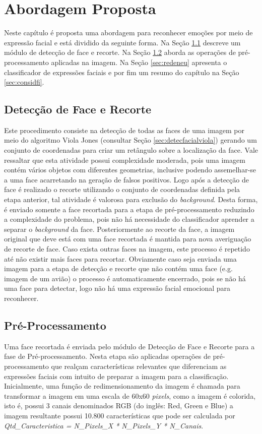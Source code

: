 \chapter{Abordagem Proposta}\label{sec:abordagemproposta}
Neste capítulo é proposta uma abordagem para reconhecer emoções por meio de expressão facial e está dividido da seguinte forma. Na Seção \ref{sec:detect} descreve um módulo de detecção de face e recorte. Na Seção \ref{sec:preproc} aborda as operações de pré-processamento aplicadas na imagem. Na Seção \ref{sec:redeneu} apresenta o classificador de expressões faciais e por fim um resumo do capítulo na Seção \ref{sec:considfi}.

\section{Detecção de Face e Recorte}\label{sec:detect}
Este procedimento consiste na detecção de todas as faces de uma imagem por meio do algoritmo Viola Jones (consultar Seção \ref{sec:detecfacialviola}) gerando um conjunto de coordenadas para criar um retângulo sobre a localização da face. Vale ressaltar que esta atividade possui complexidade moderada, pois uma imagem contém vários objetos com diferentes geometrias, inclusive podendo assemelhar-se a uma face acarretando na geração de falsos positivos. Logo após a detecção de face é realizado o recorte utilizando o conjunto de coordenadas definida pela etapa anterior, tal atividade é valorosa para exclusão do \textit{background}. Desta forma, é enviado somente a face recortada para a etapa de pré-processamento reduzindo a complexidade do problema, pois não há necessidade do classificador aprender a separar o \textit{background} da face. Posteriormente ao recorte da face, a imagem original que deve está com uma face recortada é mantida para nova averiguação de recorte de face. Caso exista outras faces na imagem, este processo é repetido até não existir mais faces para recortar. Obviamente caso seja enviada uma imagem para a etapa de detecção e recorte que não contém uma face (e.g. imagem de um avião) o processo é automaticamente encerrado, pois se não há uma face para detectar, logo não há uma expressão facial emocional para reconhecer. 

\section{Pré-Processamento}\label{sec:preproc}
Uma face recortada é enviada pelo módulo de Detecção de Face e Recorte para a fase de Pré-processamento. Nesta etapa são aplicadas operações de pré-processamento que realçam características relevantes que diferenciam as expressões faciais com intuito de preparar a imagem para a classificação. Inicialmente, uma função de redimensionamento da imagem é chamada para transformar a imagem em uma escala de 60x60 \textit{pixels}, como a imagem é colorida, isto é, possui 3 canais denominados RGB (do inglês: Red, Green e Blue) a imagem resultante possui 10.800 características que pode ser calculada por \textit{Qtd_Caracteristica = N_Pixels_X * N_Pixels_Y * N_Canais}. 

